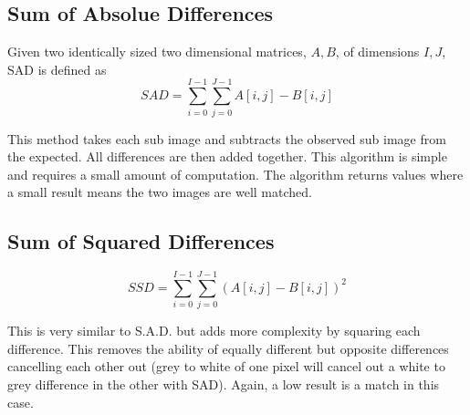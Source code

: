 \subsection{Sum of Absolue Differences}

Given two identically sized two dimensional matrices, $A, B$, of dimensions $I,J$, SAD is defined as
\begin{equation} \label{eq:SAD}
SAD = \sum\limits_{i=0}^{I-1} \sum\limits_{j=0}^{J-1} A[i,j] - B[i,j] 
\end{equation}

This method takes each sub image and subtracts the observed sub image from the expected. All differences are then added together. This algorithm is simple and requires a small amount of computation. The algorithm returns values where a small result means the two images are well matched.

\subsection{Sum of Squared Differences}
\begin{equation}\label{eq:SSD}
SSD = \sum\limits_{i=0}^{I-1} \sum\limits_{j=0}^{J-1} (A[i,j] - B[i,j] )^2
\end{equation}

This is very similar to S.A.D. but adds more complexity by squaring each difference. This removes the ability of equally different but opposite differences cancelling each other out (grey to white of one pixel will cancel out a white to grey difference in the other with SAD). Again, a low result is a match in this case.

%


